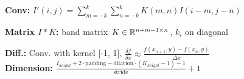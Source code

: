 \textbf{Conv:} $I'(i,j) = \sum_{m = -k}^k \sum_{n= -k}^k K(m,n) I(i-m, j-n)$\\

\textbf{Matrix $I * K$:} band matrix $K \in \mathbb{R}^{n+m-1 \times n}$, $k_i$ on diagonal\\

\textbf{Diff.:} Conv. with kernel [-1, 1], $\frac{\delta f}{\delta x} \approx \frac{f(x_{n+1}, y) - f(x_n, y)}{\Delta x}$\\


\textbf{Dimension:} $\frac{I_{height} + 2 \cdot \text{padding} - \text{dilation} \cdot (K_{height} - 1) - 1}{\text{stride}} + 1$\\

